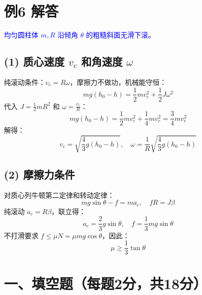 \documentclass[11pt,a4paper]{article}
\begin{document}
\section*{例6 解答}
\textcolor{blue}{均匀圆柱体 \(m, R\) 沿倾角 \(\theta\) 的粗糙斜面无滑下滚。}

\subsection*{(1) 质心速度 \(v_c\) 和角速度 \(\omega\)}
纯滚动条件：\(v_c = R\omega\)，摩擦力不做功，机械能守恒：
\[
mg(h_0 - h) = \frac{1}{2}mv_c^2 + \frac{1}{2}J\omega^2
\]
代入 \(J = \frac{1}{2}mR^2\) 和 \(\omega = \frac{v_c}{R}\)：
\[
mg(h_0 - h) = \frac{1}{2}mv_c^2 + \frac{1}{4}mv_c^2 = \frac{3}{4}mv_c^2
\]
解得：
\[
v_c = \sqrt{\frac{4}{3}g(h_0 - h)},\quad \omega = \frac{1}{R}\sqrt{\frac{4}{3}g(h_0 - h)}
\]

\subsection*{(2) 摩擦力条件}
对质心列牛顿第二定律和转动定律：
\[
mg\sin\theta - f = ma_c,\quad fR = J\beta
\]
纯滚动 \(a_c = R\beta\)，联立得：
\[
a_c = \frac{2}{3}g\sin\theta,\quad f = \frac{1}{3}mg\sin\theta
\]
不打滑要求 \(f \le \mu N = \mu mg\cos\theta\)，因此：
\[
\mu \ge \frac{1}{3}\tan\theta
\]

























\section*{一、填空题（每题2分，共18分）}
\end{document}
